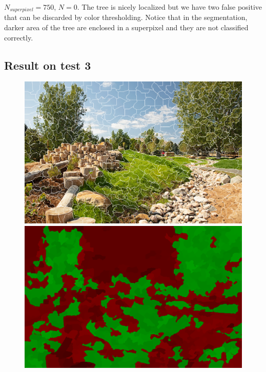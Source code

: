 \documentclass[a4paper,titlepaget]{article}
\begin{document}
$N_{superpixel}=750$, $N=0$. The tree is nicely localized but we have two false positive that can be discarded by color thresholding. Notice that in the segmentation, darker area of the tree are enclosed in a superpixel and they are not classified correctly.
\newpage

\subsection{Result on test 3}
\begin{figure}[htpb] 
	\centering
	\begin{minipage}{.3\textwidth}
		\includegraphics[width=1.7\textwidth]{images/results/3seg} 
	\end{minipage}
	\hspace{.25\textwidth}
	\begin{minipage}{.3\textwidth}
		\includegraphics[width=1.7\textwidth]{images/results/3map}
	\end{minipage}  
\end{figure}
\end{document}
